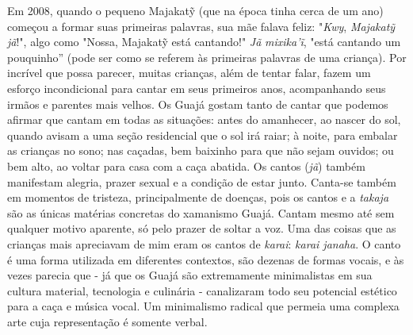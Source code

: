 Em 2008, quando o pequeno Majakatỹ (que na época tinha cerca de um ano)
começou a formar suas primeiras palavras, sua mãe falava feliz:
"\emph{Kwy}, \emph{Majakatỹ} \emph{jã}!", algo como "Nossa, Majakatỹ
está cantando!" \emph{Jã} \emph{mixika'ĩ}, "está cantando um pouquinho''
(pode ser como se referem às primeiras palavras de uma criança). Por
incrível que possa parecer, muitas crianças, além de tentar falar, fazem
um esforço incondicional para cantar em seus primeiros anos,
acompanhando seus irmãos e parentes mais velhos. Os Guajá gostam tanto
de cantar que podemos afirmar que cantam em todas as situações: antes do
amanhecer, ao nascer do sol, quando avisam a uma seção residencial que o
sol irá raiar; à noite, para embalar as crianças no sono; nas caçadas,
bem baixinho para que não sejam ouvidos; ou bem alto, ao voltar para
casa com a caça abatida. Os cantos (\emph{jã}) também manifestam
alegria, prazer sexual e a condição de estar junto. Canta-se também em
momentos de tristeza, principalmente de doenças, pois os cantos e a
\emph{takaja} são as únicas matérias concretas do xamanismo Guajá.
Cantam mesmo até sem qualquer motivo aparente, só pelo prazer de soltar
a voz. Uma das coisas que as crianças mais apreciavam de mim eram os
cantos de \emph{karai}: \emph{karai janaha}. O canto é uma forma
utilizada em diferentes contextos, são dezenas de formas vocais, e às
vezes parecia que - já que os Guajá são extremamente minimalistas em sua
cultura material, tecnologia e culinária - canalizaram todo seu
potencial estético para a caça e música vocal. Um minimalismo radical
que permeia uma complexa arte cuja representação é somente verbal.

